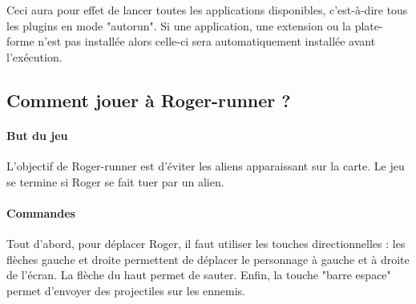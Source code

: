     Ceci aura pour effet de lancer toutes les applications disponibles, c'est-à-dire tous les plugins en mode "autorun". Si une application, une extension ou la plate-forme n'est pas installée alors celle-ci sera automatiquement installée avant l'exécution.
    
\subsection{Comment jouer à Roger-runner ?}
    \paragraph{But du jeu}
    L'objectif de Roger-runner est d'éviter les aliens apparaissant sur la carte. Le jeu se termine si Roger se fait tuer par un alien.
    
    \paragraph{Commandes}
    Tout d'abord, pour déplacer Roger, il faut utiliser les touches directionnelles : les flèches gauche et droite permettent de déplacer le personnage à gauche et à droite de l'écran. La flèche du haut permet de sauter. Enfin, la touche "barre espace" permet d'envoyer des projectiles sur les ennemis.
    
    
